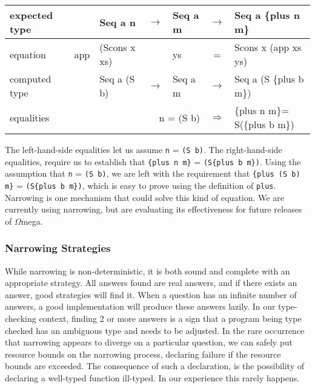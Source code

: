\documentclass[11pt,twoside]{article}
\newcommand{\om}{$\Omega$mega}
\newcommand{\plus}[2]{\{plus {#1} {#2}\}}
\begin{document}
\vspace*{.1in}
\begin{tabular}{|l|rlclcl|} \hline
{\small expected type} & &{\small{{Seq a n}}} & $\rightarrow$ & {\small{{Seq a m}}} & $\rightarrow$ &  {\small{{Seq a \plus{n}{m}}}}\\ \hline
{\small equation} & {\small{app}}&  {\small{{(Scons x xs)}}} & &  {\small{{ys}}} & = & {\small{{Scons x (app xs ys)}}} \\ \hline
{\small computed type} & & {\small{{Seq a (S b)}}} & $\rightarrow$ & {\small{{Seq a m}}} & $\rightarrow$ & {\small{{Seq a (S \plus{b}{m})}}}  \\ \hline
{\small equalities}    & & \multicolumn{3}{r}{\small{{n = (S b)}}} & $\Rightarrow$ & {\small{{\plus{n}{m}= S(\plus{b}{m})}}} \\ \hline 
\end{tabular}
\vspace*{.1in}

The left-hand-side equalities let us
assume \verb+n+ = \verb+(S b)+. The right-hand-side equalities, require us
to establish that \verb+{plus n m}+ = \verb+(S{plus b m})+.   Using the assumption that 
\verb+n+ = \verb+(S b)+, we are left with the requirement that \verb+{plus (S b) m}+ = \verb+(S{plus b m})+,
which is easy to prove using the definition of \verb+plus+. Narrowing is one
mechanism that could solve this kind of equation. We are currently using
narrowing, but are evaluating its effectiveness for future releases of \om.

\subsubsection{Narrowing Strategies} \label{ISEQ}

While narrowing is non-deterministic, it is both sound and complete with an
appropriate strategy\cite{Antoy:2005:ESF}. All answers found are real answers, and if
there exists an answer, good strategies will find it. When a question has an infinite
number of answers, a good implementation will produce these answers lazily.  In our
type-checking context, finding 2 or more answers is a sign that a program being type
checked has an ambiguous type and needs to be adjusted. In the rare occurrence that
narrowing appears to diverge on a particular question, we can safely put resource
bounds on the narrowing process, declaring failure if the resource bounds are
exceeded. The consequence of such a declaration, is the possibility of declaring a 
well-typed function ill-typed. In our experience this rarely happens.
\end{document}

